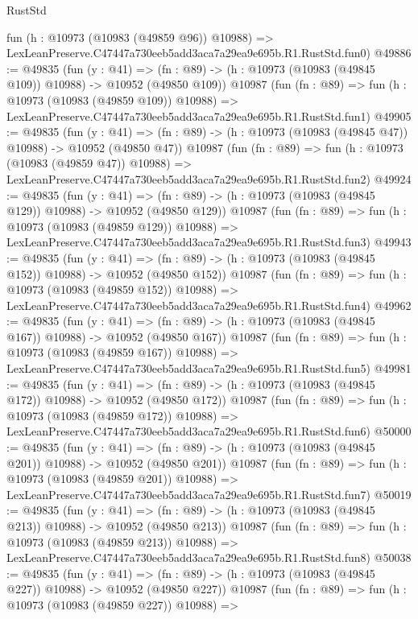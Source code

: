 \begin{lexlean}{RustStd}
\begin{coremodule}
    fun (h : @10973 (@10983 (@49859 @96)) @10988) =>
    LexLeanPreserve.C47447a730eeb5add3aca7a29ea9e695b.R1.RustStd.fun0)
@49886 := @49835
    (fun (y : @41) =>
    (fn : @89) -> (h : @10973 (@10983 (@49845 @109)) @10988) -> @10952 (@49850 @109))
    @10987
    (fun (fn : @89) =>
    fun (h : @10973 (@10983 (@49859 @109)) @10988) =>
    LexLeanPreserve.C47447a730eeb5add3aca7a29ea9e695b.R1.RustStd.fun1)
@49905 := @49835
    (fun (y : @41) =>
    (fn : @89) -> (h : @10973 (@10983 (@49845 @47)) @10988) -> @10952 (@49850 @47))
    @10987
    (fun (fn : @89) =>
    fun (h : @10973 (@10983 (@49859 @47)) @10988) =>
    LexLeanPreserve.C47447a730eeb5add3aca7a29ea9e695b.R1.RustStd.fun2)
@49924 := @49835
    (fun (y : @41) =>
    (fn : @89) -> (h : @10973 (@10983 (@49845 @129)) @10988) -> @10952 (@49850 @129))
    @10987
    (fun (fn : @89) =>
    fun (h : @10973 (@10983 (@49859 @129)) @10988) =>
    LexLeanPreserve.C47447a730eeb5add3aca7a29ea9e695b.R1.RustStd.fun3)
@49943 := @49835
    (fun (y : @41) =>
    (fn : @89) -> (h : @10973 (@10983 (@49845 @152)) @10988) -> @10952 (@49850 @152))
    @10987
    (fun (fn : @89) =>
    fun (h : @10973 (@10983 (@49859 @152)) @10988) =>
    LexLeanPreserve.C47447a730eeb5add3aca7a29ea9e695b.R1.RustStd.fun4)
@49962 := @49835
    (fun (y : @41) =>
    (fn : @89) -> (h : @10973 (@10983 (@49845 @167)) @10988) -> @10952 (@49850 @167))
    @10987
    (fun (fn : @89) =>
    fun (h : @10973 (@10983 (@49859 @167)) @10988) =>
    LexLeanPreserve.C47447a730eeb5add3aca7a29ea9e695b.R1.RustStd.fun5)
@49981 := @49835
    (fun (y : @41) =>
    (fn : @89) -> (h : @10973 (@10983 (@49845 @172)) @10988) -> @10952 (@49850 @172))
    @10987
    (fun (fn : @89) =>
    fun (h : @10973 (@10983 (@49859 @172)) @10988) =>
    LexLeanPreserve.C47447a730eeb5add3aca7a29ea9e695b.R1.RustStd.fun6)
@50000 := @49835
    (fun (y : @41) =>
    (fn : @89) -> (h : @10973 (@10983 (@49845 @201)) @10988) -> @10952 (@49850 @201))
    @10987
    (fun (fn : @89) =>
    fun (h : @10973 (@10983 (@49859 @201)) @10988) =>
    LexLeanPreserve.C47447a730eeb5add3aca7a29ea9e695b.R1.RustStd.fun7)
@50019 := @49835
    (fun (y : @41) =>
    (fn : @89) -> (h : @10973 (@10983 (@49845 @213)) @10988) -> @10952 (@49850 @213))
    @10987
    (fun (fn : @89) =>
    fun (h : @10973 (@10983 (@49859 @213)) @10988) =>
    LexLeanPreserve.C47447a730eeb5add3aca7a29ea9e695b.R1.RustStd.fun8)
@50038 := @49835
    (fun (y : @41) =>
    (fn : @89) -> (h : @10973 (@10983 (@49845 @227)) @10988) -> @10952 (@49850 @227))
    @10987
    (fun (fn : @89) =>
    fun (h : @10973 (@10983 (@49859 @227)) @10988) =>

\end{coremodule}
\end{lexlean}
